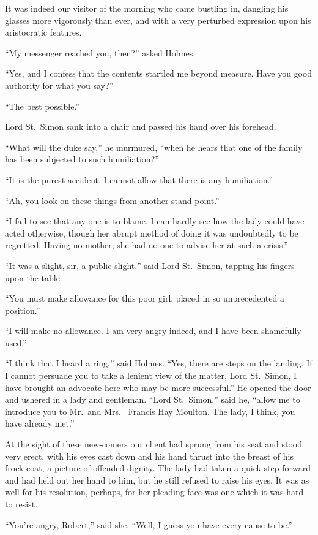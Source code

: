 It was indeed our visitor of the morning who came bustling
in, dangling his glasses more vigorously than ever, and with a
very perturbed expression upon his aristocratic features.

“My messenger reached you, then?” asked Holmes.

“Yes, and I confess that the contents startled me beyond
measure. Have you good authority for what you say?”

“The best possible.”

Lord St.~Simon sank into a chair and passed his hand over
his forehead.

“What will the duke say,” he murmured, “when he hears
that one of the family has been subjected to such
humiliation?”

“It is the purest accident. I cannot allow that there is any
humiliation.”

“Ah, you look on these things from another stand-point.”

“I fail to see that any one is to blame. I can hardly see
how the lady could have acted otherwise, though her abrupt
method of doing it was undoubtedly to be regretted. Having
no mother, she had no one to advise her at such a crisis.”

“It was a slight, sir, a public slight,” said Lord St.~Simon,
tapping his fingers upon the table.

“You must make allowance for this poor girl, placed in so
unprecedented a position.”

“I will make no allowance. I am very angry indeed, and I
have been shamefully used.”

“I think that I heard a ring,” said Holmes. “Yes, there
are steps on the landing. If I cannot persuade you to take a
lenient view of the matter, Lord St.~Simon, I have brought an
advocate here who may be more successful.” He opened the
door and ushered in a lady and gentleman. “Lord St.~Simon,”
said he, “allow me to introduce you to Mr.~and Mrs.\ %
Francis Hay Moulton. The lady, I think, you have already
met.”

At the sight of these new-comers our client had sprung
from his seat and stood very erect, with his eyes cast down
and his hand thrust into the breast of his frock-coat, a picture
of offended dignity. The lady had taken a quick step forward
and had held out her hand to him, but he still refused to
raise his eyes. It was as well for his resolution, perhaps, for
her pleading face was one which it was hard to resist.

“You’re angry, Robert,” said she. “Well, I guess you
have every cause to be.”

